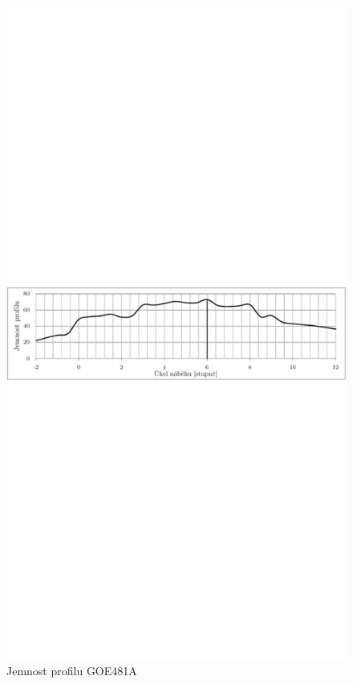 		\begin{figure}[H]
				\centering
				\includegraphics[]{obrazky/grafy/goejp}
				\caption{Jemnost profilu GOE481A}
				\label{profil:goej}
		\end{figure}
		
